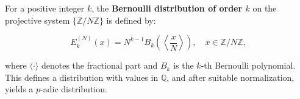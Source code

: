 For a positive integer $k$, the \textbf{Bernoulli distribution of order $k$} on the
projective system $\{\mathbb{Z}/N\mathbb{Z}\}$ is defined by:

$$E_k^{(N)}(x) = N^{k-1} B_k\!\left(\left\langle \frac{x}{N} \right\rangle\right), \quad x \in \mathbb{Z}/N\mathbb{Z},$$

where $\langle \cdot \rangle$ denotes the fractional part and $B_k$ is the $k$-th
Bernoulli polynomial. This defines a distribution with values in $\mathbb{Q}$, and
after suitable normalization, yields a $p$-adic distribution.
